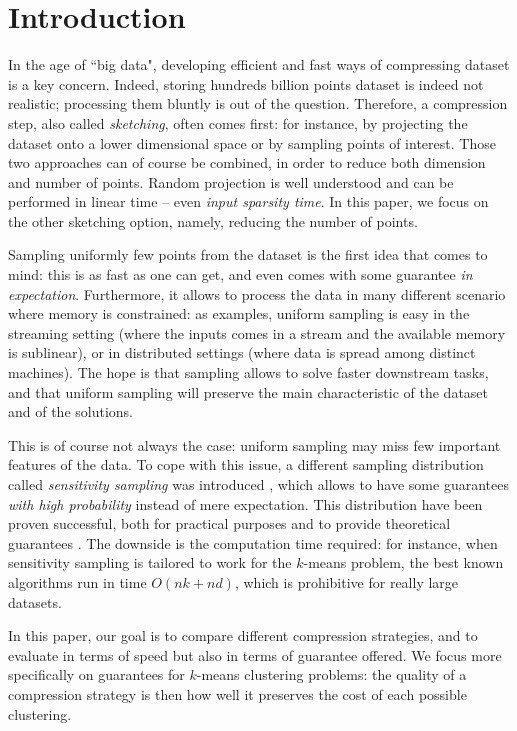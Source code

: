 \section{Introduction}

In the age of ``big data", developing efficient and fast ways of compressing dataset is a key concern. Indeed, storing hundreds billion points dataset is indeed not realistic; processing them bluntly is out of the question. 
Therefore, a compression step, also called \textit{sketching}, often comes first: for instance, by projecting the dataset onto a lower dimensional space or by sampling points of interest. Those two approaches can of course be combined, in order to reduce both dimension and number of points. 
Random projection is well understood and can be performed in linear time -- even \textit{input sparsity time}. 
In this paper, we focus on the other sketching option, namely, reducing the number of points.

Sampling uniformly few points from the dataset is the first idea that comes to mind: this is as fast as one can get, and even comes with some guarantee \emph{in expectation}. 
Furthermore, it allows to process the data in many different scenario where memory is constrained: as examples, uniform sampling is easy in the streaming setting (where the inputs comes in a stream and the available memory is sublinear), or in distributed settings (where data is spread among distinct machines).
The hope is that sampling allows to solve faster downstream tasks, and that uniform sampling will preserve the main characteristic of the dataset and of the solutions.

This is of course not always the case: uniform sampling may miss few important features of the data. 
To cope with this issue, a different sampling distribution called \textit{sensitivity sampling} was introduced \cite{LS10}, which allows to have some guarantees \textit{with high probability} instead of mere expectation.
This distribution have been proven successful, both for practical purposes \cite{} and to provide theoretical guarantees \cite{FeldmanL11, CohenP15}. 
The downside is the computation time required: for instance, when sensitivity sampling is tailored to work for the $k$-means problem, the best known algorithms run in time $O(nk+nd)$, which is prohibitive for really large datasets.

In this paper, our goal is to compare different compression strategies, and to evaluate in terms of speed but also in terms of guarantee offered. We focus more specifically on guarantees for $k$-means clustering problems: the quality of a compression strategy is then how well it preserves the cost of each possible clustering.



